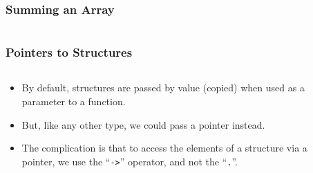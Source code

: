 
\begin{frame}[fragile]
\frametitle{Summing an Array}
\begin{columns}[T]

\begin{column}{0.30\textwidth}

\end{column}

\pause
\begin{column}{0.30\textwidth}

\end{column}

\pause
\begin{column}{0.30\textwidth}

\end{column}

\end{columns}
\end{frame}


\begin{frame}[fragile]
\frametitle{Pointers to Structures}
\begin{columns}[T]

\begin{column}{0.30\textwidth}
\begin{itemize}[<+->]
\item By default, structures are passed by value (copied) when used as a parameter to a function.
\item But, like any other type, we could pass a pointer instead.
\item The complication is that to access the elements of a structure via a pointer, we use the ``\verb^->^'' operator, and not the ``\verb^.^''.
\end{itemize}
\end{column}

\pause
\begin{column}{0.60\textwidth}

\end{column}

\end{columns}
\end{frame}


